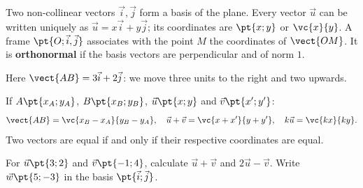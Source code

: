 \begin{keypoint}[Definitions]
Two non-collinear vectors $\vec i,\vec j$ form a basis of the plane. Every vector $\vec u$ can be written uniquely as $\vec u=x\vec i+y\vec j$; its coordinates are $\pt{x;y}$ or $\vc{x}{y}$.
A frame $\pt{O;\vec i,\vec j}$ associates with the point $M$ the coordinates of $\vect{OM}$. It is \textbf{orthonormal} if the basis vectors are perpendicular and of norm $1$.
\end{keypoint}
\begin{center}\end{center}
Here $\vect{AB}=3\vec i+2\vec j$: we move three units to the right and two upwards.
\begin{keypoint}
If $A\pt{x_A;y_A}$, $B\pt{x_B;y_B}$, $\vec u\pt{x;y}$ and $\vec v\pt{x';y'}$:
\[\vect{AB}=\vc{x_B-x_A}{y_B-y_A},\quad \vec u+\vec v=\vc{x+x'}{y+y'},\quad k\vec u=\vc{kx}{ky}.\]
Two vectors are equal if and only if their respective coordinates are equal.
\end{keypoint}
\begin{example}For $\vec u\pt{3;2}$ and $\vec v\pt{-1;4}$, calculate $\vec u+\vec v$ and $2\vec u-\vec v$. Write $\vec w\pt{5;-3}$ in the basis $\pt{\vec i;\vec j}$.\end{example}

